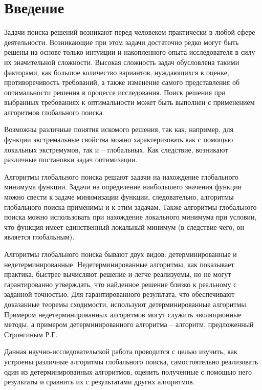 





\renewcommand{\contentsname}{Содержание}
\newpage
\tableofcontents

\newpage
\section*{Введение}
Задачи поиска решений возникают перед человеком практически в любой сфере деятельности. Возникающие при этом задачи достаточно редко могут быть решены на основе только интуиции и накопленного опыта исследователя в силу их значительной сложности. Высокая сложность задач обусловлена такими факторами, как большое количество вариантов, нуждающихся в оценке, противоречивость требований, а также изменение самого представления об оптимальности решения в процессе исследования. Поиск решения при выбранных требованиях к оптимальности может быть выполнен с применением алгоритмов глобального поиска.

Возможны различные понятия искомого решения, так как, например, для функции экстремальные свойства можно характеризовать как с помощью локальных экстремумов, так и – глобальных. Как следствие, возникают различные постановки задач оптимизации.

Алгоритмы глобального поиска решают задачи на нахождение глобального минимума функции. Задачи на определение наибольшего значения функции можно свести к задаче минимизации функции, следовательно, алгоритмы глобального поиска применимы и к этим задачам. Также алгоритмы глобального поиска можно использовать при нахождение локального минимума при условии, что функция имеет единственный локальный минимум (в следствие чего, он является глобальным).

Алгоритмы глобального поиска бывают двух видов: детерминированные и недетерминированные. Недетерминированные алгоритмы, как показывает практика, быстрее вычисляют решение и легче реализуемы, но не могут гарантированно утверждать, что найденное решение близко к реальному с заданной точностью. Для гарантированного результата, что обеспечивают доказанные теоремы сходимости, используют детерминированные алгоритмы.  Примером недетерминированных алгоритмов могут служить эволюционные методы, а примером детерминированного алгоритма – алгоритм, предложенный Стронгиным Р.Г.

Данная научно-исследовательской работа проводится с целью изучить, как устроены различные алгоритмы глобального поиска, самостоятельно реализовать один из детерминированных алгоритмов, оценить полученные с помощью него результаты и сравнить их с результатами других алгоритмов.

